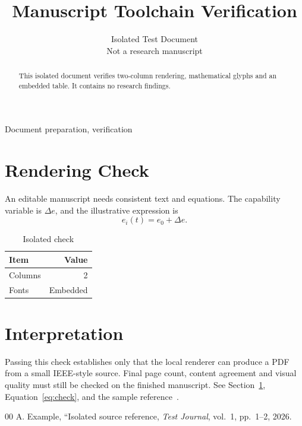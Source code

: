 \documentclass[conference,a4paper]{IEEEtran}
\newcommand{\IEEEauthorblockN}[1]{#1\\}
\newcommand{\IEEEauthorblockA}[1]{#1}
\begin{document}
\title{Manuscript Toolchain Verification}
\author{\IEEEauthorblockN{Isolated Test Document}\IEEEauthorblockA{Not a research manuscript}}
\maketitle
\begin{abstract}This isolated document verifies two-column rendering, mathematical glyphs and an embedded table. It contains no research findings.\end{abstract}
\begin{IEEEkeywords}Document preparation, verification\end{IEEEkeywords}
\section{Rendering Check}\label{sec:check}
An editable manuscript needs consistent text and equations. The capability variable is $\Delta e$, and the illustrative expression is
\begin{equation} e_i(t)=e_0+\Delta e.\label{eq:check}\end{equation}
\begin{table}[h]\centering\caption{Isolated check}\begin{tabular}{lr}\toprule Item&Value\\\midrule Columns&2\\Fonts&Embedded\\\bottomrule\end{tabular}\end{table}
\section{Interpretation}
Passing this check establishes only that the local renderer can produce a PDF from a small IEEE-style source. Final page count, content agreement and visual quality must still be checked on the finished manuscript.
See Section~\ref{sec:check}, Equation~\ref{eq:check}, and the sample reference~\cite{sample}.
\begin{thebibliography}{00}
 A. Example, ``Isolated source reference, \emph{Test Journal}, vol.~1, pp.~1--2, 2026.
\end{thebibliography}
\end{document}
